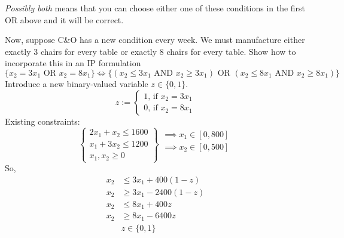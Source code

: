 \begin{remark}
    \emph{Possibly both} means that you can choose either one of these
    conditions in the first OR above and it will be correct.
\end{remark}

\begin{exbox}
    \begin{example}
        Now, suppose C\&O has a new condition every week. We must manufacture either
        exactly 3 chairs for every table or exactly 8 chairs for every table. Show
        how to incorporate this in an IP formulation
        \[
            \{x_2=3x_1 \text{ OR } x_2=8x_1\}
            \iff
            \{(x_2\leqslant 3x_1 \text{ AND } x_2\geqslant 3x_1) \text{ OR }
            (x_2\leqslant 8x_1 \text{ AND } x_2\geqslant 8x_1)\}
        \]
        Introduce a new binary-valued variable $z\in\{0,1\}$.
        \[
            z:=
            \begin{cases}
                1 \text{, if } x_2=3x_1 \\
                0 \text{, if } x_2=8x_1
            \end{cases}
        \]
        Existing constraints:
        \[
            \left\{\begin{array}{r}
                2x_1 + x_2 \leqslant 1600 \\
                x_1 + 3x_2 \leqslant 1200 \\
                x_1, x_2 \geqslant  0
            \end{array}\right\}
            \begin{array}{r}
                \implies x_1\in[0,800] \\
                \implies x_2\in[0,500] \\
                \\
            \end{array}
        \]
        So,
        \begin{align*}
            x_2 & \leqslant 3x_1+400(1-z)   \\
            x_2 & \geqslant  3x_1-2400(1-z) \\
            x_2 & \leqslant 8x_1+400z       \\
            x_2 & \geqslant  8x_1-6400z     \\
                & z\in\{0,1\}
        \end{align*}
    \end{example}
\end{exbox}